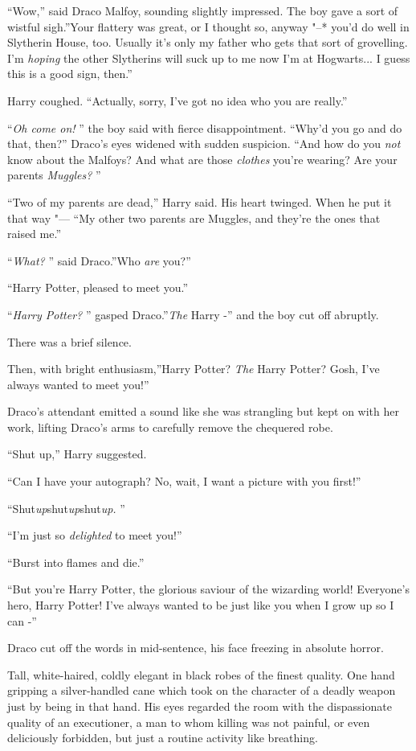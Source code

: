 ``Wow,'' said Draco Malfoy, sounding slightly impressed. The boy gave a
sort of wistful sigh.''Your flattery was great, or I thought so, anyway
"--* you'd do well in Slytherin House, too. Usually it's only my father who
gets that sort of grovelling. I'm \emph{hoping} the other Slytherins
will suck up to me now I'm at Hogwarts... I guess this is a good
sign, then.''

Harry coughed. ``Actually, sorry, I've got no idea who you are really.''

``\emph{Oh come on!} '' the boy said with fierce disappointment. ``Why'd
you go and do that, then?'' Draco's eyes widened with sudden suspicion.
``And how do you \emph{not} know about the Malfoys? And what are those
\emph{clothes} you're wearing? Are your parents \emph{Muggles?} ''

``Two of my parents are dead,'' Harry said. His heart twinged. When he
put it that way "--- ``My other two parents are Muggles, and they're the
ones that raised me.''

``\emph{What?} '' said Draco.''Who \emph{are} you?''

``Harry Potter, pleased to meet you.''

``\emph{Harry Potter?} '' gasped Draco.''\emph{The} Harry -'' and the boy
cut off abruptly.

There was a brief silence.

Then, with bright enthusiasm,''Harry Potter? \emph{The} Harry Potter?
Gosh, I've always wanted to meet you!''

Draco's attendant emitted a sound like she was strangling but kept on
with her work, lifting Draco's arms to carefully remove the chequered
robe.

``Shut up,'' Harry suggested.

``Can I have your autograph? No, wait, I want a picture with you
first!''

``Shut\emph{up}shut\emph{up}shut\emph{up.} ''

``I'm just so \emph{delighted} to meet you!''

``Burst into flames and die.''

``But you're Harry Potter, the glorious saviour of the wizarding world!
Everyone's hero, Harry Potter! I've always wanted to be just like you
when I grow up so I can -''

Draco cut off the words in mid-sentence, his face freezing in absolute
horror.

Tall, white-haired, coldly elegant in black robes of the finest quality.
One hand gripping a silver-handled cane which took on the character of a
deadly weapon just by being in that hand. His eyes regarded the room
with the dispassionate quality of an executioner, a man to whom killing
was not painful, or even deliciously forbidden, but just a routine
activity like breathing.

